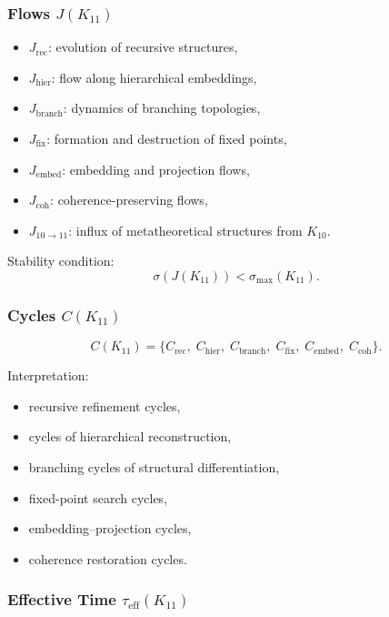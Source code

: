 \subsubsection{Flows $J(K_{11})$}

\begin{itemize}
    \item $J_{\mathrm{rec}}$: evolution of recursive structures,
    \item $J_{\mathrm{hier}}$: flow along hierarchical embeddings,
    \item $J_{\mathrm{branch}}$: dynamics of branching topologies,
    \item $J_{\mathrm{fix}}$: formation and destruction of fixed points,
    \item $J_{\mathrm{embed}}$: embedding and projection flows,
    \item $J_{\mathrm{coh}}$: coherence-preserving flows,
    \item $J_{10\to11}$: influx of metatheoretical structures from $K_{10}$.
\end{itemize}

Stability condition:
\[
\sigma(J(K_{11})) < \sigma_{\max}(K_{11}).
\]

\subsubsection{Cycles $C(K_{11})$}

\[
C(K_{11})=
\{
C_{\mathrm{rec}},\;
C_{\mathrm{hier}},\;
C_{\mathrm{branch}},\;
C_{\mathrm{fix}},\;
C_{\mathrm{embed}},\;
C_{\mathrm{coh}}
\}.
\]

Interpretation:
\begin{itemize}
    \item recursive refinement cycles,
    \item cycles of hierarchical reconstruction,
    \item branching cycles of structural differentiation,
    \item fixed-point search cycles,
    \item embedding–projection cycles,
    \item coherence restoration cycles.
\end{itemize}

\subsubsection{Effective Time $\tau_{\mathrm{eff}}(K_{11})$}

